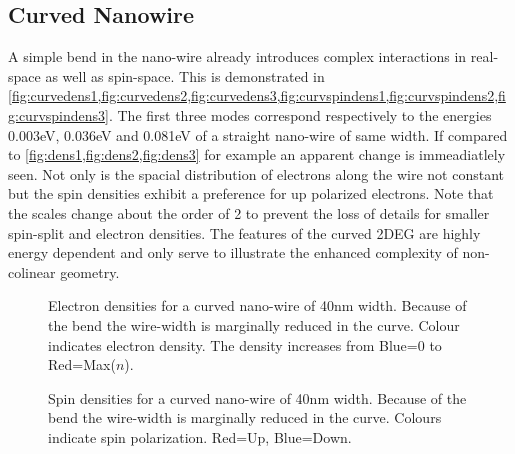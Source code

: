 \subsection{Curved Nanowire}
A simple bend in the nano-wire already introduces complex interactions in real-space as well as spin-space. This is demonstrated in \cref{fig:curvedens1,fig:curvedens2,fig:curvedens3,fig:curvspindens1,fig:curvspindens2,fig:curvspindens3}. The first three modes correspond respectively to the energies 0.003eV, 0.036eV and 0.081eV of a straight nano-wire of same width. If compared to \cref{fig:dens1,fig:dens2,fig:dens3} for example an apparent change is immeadiatlely seen. Not only is the spacial distribution of electrons along the wire not constant but the spin densities exhibit a preference for up polarized electrons. Note that the scales change about the order of 2 to prevent the loss of details for smaller spin-split and electron densities. The features of the curved 2DEG are highly energy dependent and only serve to illustrate the enhanced complexity of non-colinear geometry.
\begin{figure}[h!]
\caption{Electron densities for a curved nano-wire of 40nm width. Because of the bend the wire-width is marginally reduced in the curve. Colour indicates electron density. The density increases from Blue=0 to Red=Max($n$).}
\end{figure}
\begin{figure}[h!]
\caption{Spin densities for a curved nano-wire of 40nm width. Because of the bend the wire-width is marginally reduced in the curve. Colours indicate spin polarization. Red=Up, Blue=Down.}
\end{figure}

